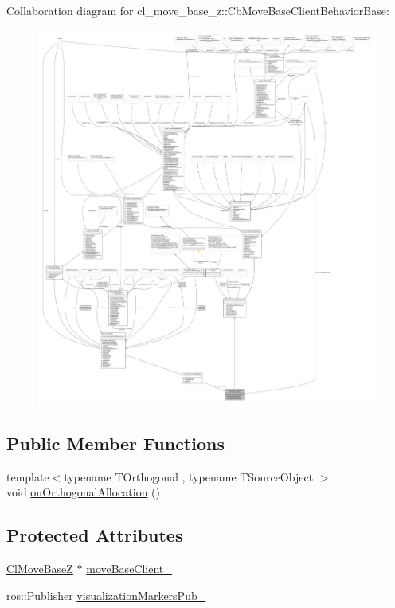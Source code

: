Collaboration diagram for cl\+\_\+move\+\_\+base\+\_\+z\+:\+:Cb\+Move\+Base\+Client\+Behavior\+Base\+:
\nopagebreak
\begin{figure}[H]
\begin{center}
\leavevmode
\includegraphics[width=350pt]{classcl__move__base__z_1_1CbMoveBaseClientBehaviorBase__coll__graph}
\end{center}
\end{figure}
\subsection*{Public Member Functions}
\begin{DoxyCompactItemize}
\item 
{\footnotesize template$<$typename T\+Orthogonal , typename T\+Source\+Object $>$ }\\void \hyperlink{classcl__move__base__z_1_1CbMoveBaseClientBehaviorBase_ae9e4d5856a88c367edd755cdd00b377f}{on\+Orthogonal\+Allocation} ()
\end{DoxyCompactItemize}
\subsection*{Protected Attributes}
\begin{DoxyCompactItemize}
\item 
\hyperlink{classcl__move__base__z_1_1ClMoveBaseZ}{Cl\+Move\+BaseZ} $\ast$ \hyperlink{classcl__move__base__z_1_1CbMoveBaseClientBehaviorBase_ab2ef219464cfac8659b4a87c8d0db6d5}{move\+Base\+Client\+\_\+}
\item 
ros\+::\+Publisher \hyperlink{classcl__move__base__z_1_1CbMoveBaseClientBehaviorBase_aff48fc567ae025b196efd8895b7fb35d}{visualization\+Markers\+Pub\+\_\+}
\end{DoxyCompactItemize}
